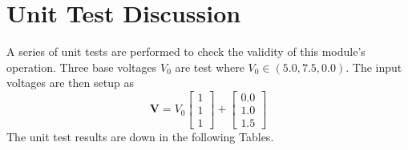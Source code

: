 \documentclass[]{BasiliskReportMemo}
\begin{document}
\section{Unit Test Discussion}
A series of unit tests are performed to check the validity of this module's operation.  Three base voltages $V_{0}$  are test where $V_{0} \in (5.0, 7.5, 0.0)$.    The input voltages are then setup as 
\begin{equation}
	\bm V = V_{0} \begin{bmatrix} 1 \\ 1 \\ 1 \end{bmatrix}
	+ \begin{bmatrix} 0.0 \\ 1.0 \\ 1.5 \end{bmatrix}
\end{equation} 
The unit test results are down in the following Tables.  




\end{document}
